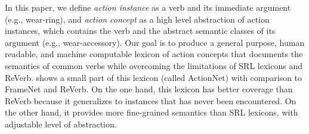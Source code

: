 %
%

%

In this paper, we define {\em action instance} as a verb and its immediate
argument (e.g., wear-ring), and {\em action concept} as a high level
abstraction of action instances, which contains the verb and the abstract
semantic classes of its argument (e.g., wear-accessory).
Our goal is to produce a general purpose,
human readable, and machine computable lexicon of action concepts that
documents the semantics of common verbs while
overcoming the limitations of SRL lexicons and ReVerb.
 shows a small part of this
lexicon (called ActionNet) with comparison to FrameNet and ReVerb.
On the one hand, this lexicon
has better coverage than ReVerb because it generalizes to
instances that has never been encountered.
On the other hand, it provides more fine-grained
semantics than SRL lexicons, with adjustable level of abstraction.

